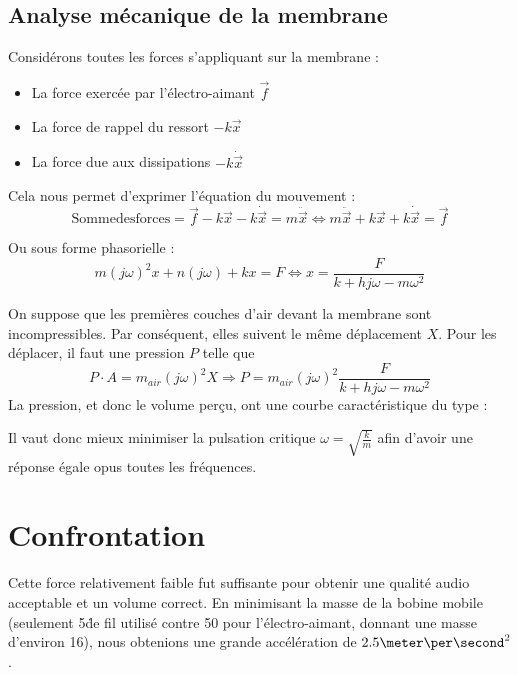 \subsection[b]{Analyse mécanique de la membrane}
Considérons toutes les forces s'appliquant sur la membrane :
\begin{itemize}
\item La force exercée par l'électro-aimant $ \vec{f} $ 
\item La force de rappel du ressort $ - k \vec{x} $
\item La force due aux dissipations $ - k \dot{\vec{x}} $
\end{itemize}

Cela nous permet d'exprimer l'équation du mouvement :
\begin{equation}
\mathrm{Somme des forces} = \vec{f} - k \vec{x} - k \dot{\vec{x}} = m \ddot{\vec{x}}
\Leftrightarrow m \ddot{\vec{x}} + k \vec{x} + k \dot{\vec{x}} = \vec{f}
\end{equation}

Ou sous forme phasorielle :
\begin{equation}
m (j\omega)^2 x + n (j\omega) + kx = F
\Leftrightarrow x = \frac{F}{k + hj\omega - m {\omega}^2}
\end{equation}

On suppose que les premières couches d’air devant la membrane sont incompressibles. Par conséquent, elles suivent le même déplacement $X$.
Pour les déplacer, il faut une pression $P$ telle que 
\begin{equation}
P\cdot A = m_{air} {(j \omega)}^{2}X
\Rightarrow P = m_{air} {(j \omega)}^{2} \frac{F}{k+hj \omega -m {\omega}^{2}}
\end{equation}
La pression, et donc le volume perçu, ont une courbe caractéristique du type :

Il vaut donc mieux minimiser la pulsation critique $\omega = \sqrt{\frac{k}{m}}$ afin d’avoir une réponse égale opus toutes les fréquences.

\section{Confrontation}
Cette force relativement faible fut suffisante pour obtenir une qualité audio acceptable et un volume correct. 
En minimisant la masse de la bobine mobile (seulement 5\meter \. de fil utilisé contre 50 pour l'électro-aimant, 
donnant une masse d'environ 16\gram), nous obtenions une grande accélération de $2.5\meter\per\second^2$. 
